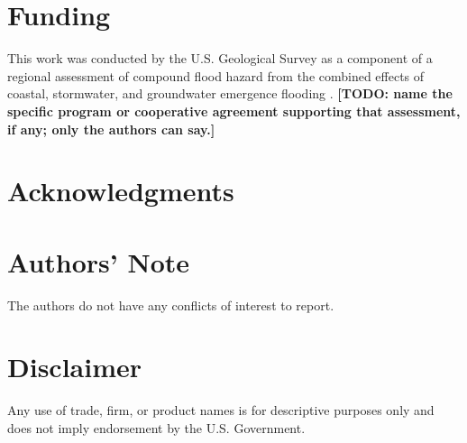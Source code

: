 \documentclass[preprint,authoryear,11pt]{elsarticle}
\begin{document}
\section*{Funding}

This work was conducted by the U.S. Geological Survey as a component of a regional assessment of compound flood hazard from the combined effects of coastal, stormwater, and groundwater emergence flooding \citep{usgs2021compound}. \textbf{[TODO: name the specific program or cooperative agreement supporting that assessment, if any; only the authors can say.]}

%
\section*{Acknowledgments}


\section*{Authors' Note}

The authors do not have any conflicts of interest to report.

\section*{Disclaimer}

Any use of trade, firm, or product names is for descriptive purposes only and does not imply endorsement by the U.S. Government.



\end{document}
